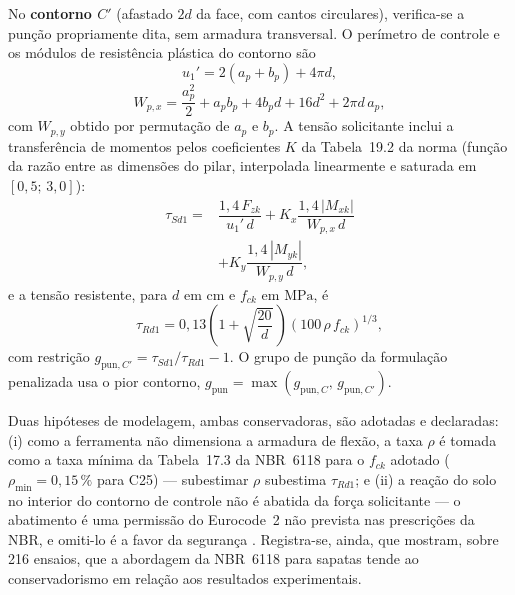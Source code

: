 No \textbf{contorno $C'$} (afastado $2d$ da face, com cantos circulares), verifica-se a punção propriamente dita, sem armadura transversal. O perímetro de controle e os módulos de resistência plástica do contorno são
\begin{equation}
    u_1' = 2(a_p + b_p) + 4\pi d,
    \label{eq:u_c_linha}
\end{equation}
\begin{equation}
    W_{p,x} = \dfrac{a_p^2}{2} + a_p b_p + 4 b_p d + 16 d^2 + 2\pi d\, a_p,
    \label{eq:wp}
\end{equation}
com $W_{p,y}$ obtido por permutação de $a_p$ e $b_p$. A tensão solicitante inclui a transferência de momentos pelos coeficientes $K$ da Tabela~19.2 da norma (função da razão entre as dimensões do pilar, interpolada linearmente e saturada em $[0{,}5;\,3{,}0]$):
\begin{equation}
    \begin{split}
    \tau_{Sd1} ={} & \dfrac{1{,}4\,F_{zk}}{u_1'\, d}
    + K_x \dfrac{1{,}4\,|M_{xk}|}{W_{p,x}\, d} \\
    & + K_y \dfrac{1{,}4\,|M_{yk}|}{W_{p,y}\, d},
    \end{split}
    \label{eq:tau_sd1}
\end{equation}
e a tensão resistente, para $d$ em $\si{\centi\meter}$ e $f_{ck}$ em $\si{\mega\pascal}$, é
\begin{equation}
    \tau_{Rd1} = 0{,}13 \left(1 + \sqrt{\dfrac{20}{d}}\,\right)
    \left(100\,\rho\, f_{ck}\right)^{1/3},
    \label{eq:tau_rd1}
\end{equation}
com restrição $g_{\mathrm{pun},C'} = \tau_{Sd1}/\tau_{Rd1} - 1$. O grupo de punção da formulação penalizada usa o pior contorno, $g_{\mathrm{pun}} = \max(g_{\mathrm{pun},C},\, g_{\mathrm{pun},C'})$.

Duas hipóteses de modelagem, ambas conservadoras, são adotadas e declaradas: (i) como a ferramenta não dimensiona a armadura de flexão, a taxa $\rho$ é tomada como a taxa mínima da Tabela~17.3 da NBR~6118 para o $f_{ck}$ adotado ($\rho_{\min} = 0{,}15\,\%$ para C25) — subestimar $\rho$ subestima $\tau_{Rd1}$; e (ii) a reação do solo no interior do contorno de controle não é abatida da força solicitante — o abatimento é uma permissão do Eurocode~2 não prevista nas prescrições da NBR, e omiti-lo é a favor da segurança . Registra-se, ainda, que  mostram, sobre 216 ensaios, que a abordagem da NBR~6118 para sapatas tende ao conservadorismo em relação aos resultados experimentais.

